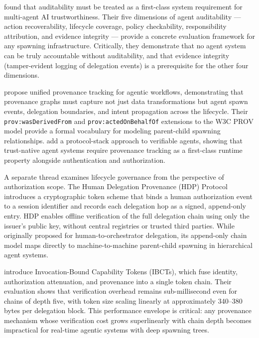  found that auditability must be treated as a first-class system requirement for multi-agent AI trustworthiness. Their five dimensions of agent auditability --- action recoverability, lifecycle coverage, policy checkability, responsibility attribution, and evidence integrity --- provide a concrete evaluation framework for any spawning infrastructure. Critically, they demonstrate that no agent system can be truly accountable without auditability, and that evidence integrity (tamper-evident logging of delegation events) is a prerequisite for the other four dimensions.

 propose unified provenance tracking for agentic workflows, demonstrating that provenance graphs must capture not just data transformations but agent spawn events, delegation boundaries, and intent propagation across the lifecycle. Their \texttt{prov:wasDerivedFrom} and \texttt{prov:actedOnBehalfOf} extensions to the W3C PROV model provide a formal vocabulary for modeling parent-child spawning relationships.  add a protocol-stack approach to verifiable agents, showing that trust-native agent systems require provenance tracking as a first-class runtime property alongside authentication and authorization.

A separate thread examines lifecycle governance from the perspective of authorization scope. The Human Delegation Provenance (HDP) Protocol \citep{draft-helixar-hdp} introduces a cryptographic token scheme that binds a human authorization event to a session identifier and records each delegation hop as a signed, append-only entry. HDP enables offline verification of the full delegation chain using only the issuer's public key, without central registries or trusted third parties. While originally proposed for human-to-orchestrator delegation, its append-only chain model maps directly to machine-to-machine parent-child spawning in hierarchical agent systems.

 introduce Invocation-Bound Capability Tokens (IBCTs), which fuse identity, authorization attenuation, and provenance into a single token chain. Their evaluation shows that verification overhead remains sub-millisecond even for chains of depth five, with token size scaling linearly at approximately 340--380 bytes per delegation block. This performance envelope is critical: any provenance mechanism whose verification cost grows superlinearly with chain depth becomes impractical for real-time agentic systems with deep spawning trees.

